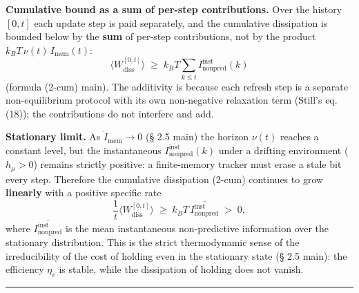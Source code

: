 \documentclass[pdflatex,sn-mathphys-ay]{sn-jnl}
\begin{document}
\textbf{Cumulative bound as a sum of per-step contributions.} Over the history \([0,t]\) each update step is paid separately, and the cumulative dissipation is bounded below by the \textbf{sum} of per-step contributions, not by the product \(k_B T\,\nu(t)\, I_{\text{mem}}(t)\): \[\Big\langle W_{\text{diss}}^{[0,t]}\Big\rangle \;\ge\; k_B T \sum_{k \le t} I_{\text{nonpred}}^{\text{inst}}(k)\] (formula (2-cum) main). The additivity is because each refresh step is a separate non-equilibrium protocol with its own non-negative relaxation term (Still's eq. (18)); the contributions do not interfere and add.



\textbf{Stationary limit.} As \(\dot I_{\text{mem}} \to 0\) (§ 2.5 main) the horizon \(\nu(t)\) reaches a constant level, but the instantaneous \(I_{\text{nonpred}}^{\text{inst}}(k)\) under a drifting environment (\(h_\mu > 0\)) remains strictly positive: a finite-memory tracker must erase a stale bit every step. Therefore the cumulative dissipation (2-cum) continues to grow \textbf{linearly} with a positive specific rate \[\frac{1}{t}\Big\langle W_{\text{diss}}^{[0,t]}\Big\rangle \;\ge\; k_B T\, \overline{I_{\text{nonpred}}^{\text{inst}}} \;>\; 0,\] where \(\overline{I_{\text{nonpred}}^{\text{inst}}}\) is the mean instantaneous non-predictive information over the stationary distribution. This is the strict thermodynamic sense of the irreducibility of the cost of holding even in the stationary state (§ 2.5 main): the efficiency \(\eta_v\) is stable, while the dissipation of holding does not vanish.



\begin{center}\rule{0.5\linewidth}{0.5pt}\end{center}



\nocite{*}

\end{document}
